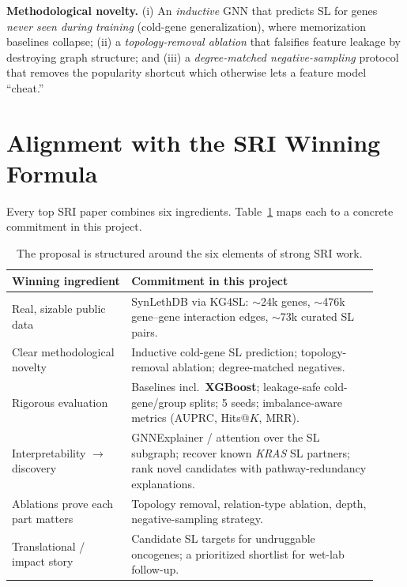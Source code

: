 \documentclass[11pt]{article}
\begin{document}
\begin{noveltybox}
\textbf{Methodological novelty.} (i) An \emph{inductive} GNN that predicts SL
for genes \emph{never seen during training} (cold-gene generalization), where
memorization baselines collapse; (ii) a \emph{topology-removal ablation} that
falsifies feature leakage by destroying graph structure; and (iii) a
\emph{degree-matched negative-sampling} protocol that removes the popularity
shortcut which otherwise lets a feature model ``cheat.''
\end{noveltybox}

\section{Alignment with the SRI Winning Formula}

Every top SRI paper combines six ingredients. Table~\ref{tab:formula} maps each
to a concrete commitment in this project.

\begin{table}[h]
\centering
\small
\begin{tabular}{>{\raggedright\arraybackslash}p{0.30\linewidth} >{\raggedright\arraybackslash}p{0.62\linewidth}}
\toprule
\rowcolor{sriblue}\color{white}\textbf{Winning ingredient} & \color{white}\textbf{Commitment in this project}\\
\midrule
\rowcolor{srirow} Real, sizable public data & SynLethDB via KG4SL: $\sim$24k genes, $\sim$476k gene--gene interaction edges, $\sim$73k curated SL pairs.\\
Clear methodological novelty & Inductive cold-gene SL prediction; topology-removal ablation; degree-matched negatives.\\
\rowcolor{srirow} Rigorous evaluation & Baselines incl.\ \textbf{XGBoost}; leakage-safe cold-gene/group splits; 5 seeds; imbalance-aware metrics (AUPRC, Hits@$K$, MRR).\\
Interpretability $\rightarrow$ discovery & GNNExplainer / attention over the SL subgraph; recover known \textit{KRAS} SL partners; rank novel candidates with pathway-redundancy explanations.\\
\rowcolor{srirow} Ablations prove each part matters & Topology removal, relation-type ablation, depth, negative-sampling strategy.\\
Translational / impact story & Candidate SL targets for undruggable oncogenes; a prioritized shortlist for wet-lab follow-up.\\
\bottomrule
\end{tabular}
\caption{The proposal is structured around the six elements of strong SRI work.}
\label{tab:formula}
\end{table}
\end{document}
